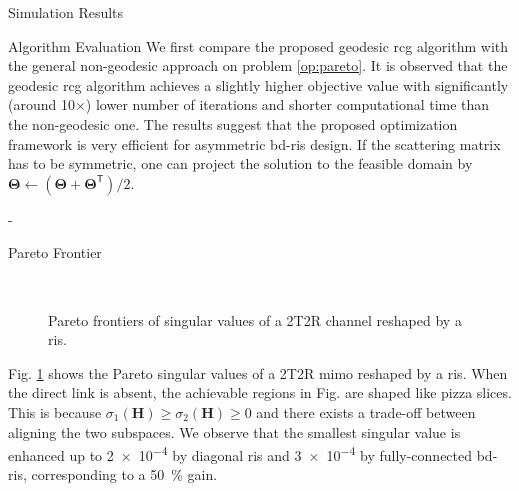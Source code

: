 \begin{section}{Simulation Results}
\begin{subsection}{Algorithm Evaluation}
		We first compare the proposed geodesic \gls{rcg} algorithm with the general non-geodesic approach \cite{Absil2009,Pan2022d} on problem \eqref{op:pareto}.
		It is observed that the geodesic \gls{rcg} algorithm achieves a slightly higher objective value with significantly (around 10$\times$) lower number of iterations and shorter computational time than the non-geodesic one.
		The results suggest that the proposed optimization framework is very efficient for asymmetric \gls{bd}-\gls{ris} design.
		If the scattering matrix has to be symmetric, one can project the solution to the feasible domain by $\mathbf{\Theta} \gets (\mathbf{\Theta} + \mathbf{\Theta}^\mathsf{T})/2$.
	\end{subsection}


	\begin{subsection}{-}
		\begin{subsubsection}{Pareto Frontier}
			\begin{figure}[H]
				\centering
				\\
				\caption{Pareto frontiers of singular values of a 2T2R channel reshaped by a \gls{ris}.}
				\label{fg:singular_pareto}
			\end{figure}
			Fig. \ref{fg:singular_pareto} shows the Pareto singular values of a 2T2R \gls{mimo} reshaped by a \gls{ris}.
			When the direct link is absent, the achievable regions in Fig.  are shaped like pizza slices.
			This is because $\sigma_1(\mathbf{H}) \ge \sigma_2(\mathbf{H}) \ge 0$ and there exists a trade-off between aligning the two subspaces.
			We observe that the smallest singular value is enhanced up to \num{2e-4} by diagonal \gls{ris} and \num{3e-4} by fully-connected \gls{bd}-\gls{ris}, corresponding to a \qty{50}{\percent} gain.

\end{subsubsection}
\end{subsection}
\end{section}

